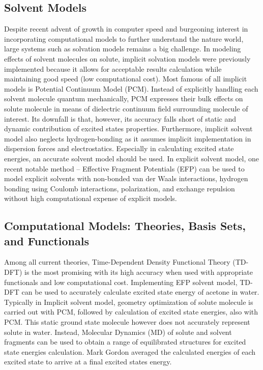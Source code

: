 \documentclass[
journal=jpcbfk, %
manuscript=article]{achemso}
\begin{document}
\subsection{Solvent Models}

Despite recent advent of growth in computer speed and burgeoning interest in incorporating computational models to further understand the nature world, large systems such as solvation models remains a big challenge.\cite{Lin2007} In modeling effects of solvent molecules on solute, implicit solvation models were previously implemented because it allows for acceptable results calculation while maintaining good speed (low computational cost). Most famous of all implicit models is Potential Continuum Model (PCM).\cite{Cossi2000} Instead of explicitly handling each solvent molecule quantum mechanically, PCM expresses their bulk effects on solute molecule in means of dielectric continuum field surrounding molecule of interest. Its downfall is that, however, its accuracy falls short of static and dynamic contribution of excited states properties.\cite{Barone2007} Furthermore, implicit solvent model also neglects hydrogen-bonding as it assumes implicit implementation in dispersion forces and electrostatics.\cite{Li1999} Especially in calculating excited state energies, an accurate solvent model should be used.\cite{Tomasi2005} In explicit solvent model, one recent notable method – Effective Fragment Potentials (EFP) can be used to model explicit solvents with non-bonded van der Waals interactions, hydrogen bonding using Coulomb interactions, polarization, and exchange repulsion without high computational expense of explicit models.\cite{Day1996,Yoo2008} 

\subsection{Computational Models: Theories, Basis Sets, and Functionals}

Among all current theories, Time-Dependent Density Functional Theory (TD-DFT) is the most promising with its high accuracy when used with appropriate functionals and low computational cost\cite{Magyar2007}. Implementing EFP solvent model, TD-DFT can be used to accurately calculate excited state energy of acetone in water.\cite{Yoo2008} Typically in Implicit solvent model, geometry optimization of solute molecule is carried out with PCM, followed by calculation of excited state energies, also with PCM. This static ground state molecule however does not accurately represent solute in water.\cite{Defusco2011} Instead, Molecular Dynamics (MD) of solute and solvent fragments can be used to obtain a range of equilibrated structures for excited state energies calculation. Mark Gordon averaged the calculated energies of each excited state to arrive at a final excited states energy.\cite{Defusco2011}
\end{document}
